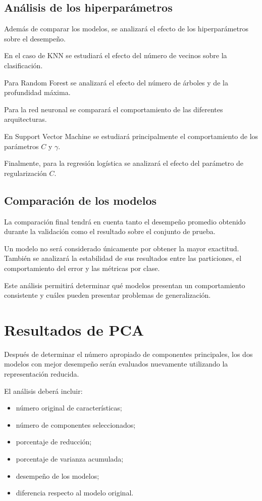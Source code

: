 \documentclass[conference]{IEEEtran}
\begin{document}
\subsection{Análisis de los hiperparámetros}

Además de comparar los modelos, se analizará el efecto de los hiperparámetros sobre el desempeño.

En el caso de KNN se estudiará el efecto del número de vecinos sobre la clasificación.

Para Random Forest se analizará el efecto del número de árboles y de la profundidad máxima.

Para la red neuronal se comparará el comportamiento de las diferentes arquitecturas.

En Support Vector Machine se estudiará principalmente el comportamiento de los parámetros $C$ y $\gamma$.

Finalmente, para la regresión logística se analizará el efecto del parámetro de regularización $C$.


\subsection{Comparación de los modelos}

La comparación final tendrá en cuenta tanto el desempeño promedio obtenido durante la validación como el resultado sobre el conjunto de prueba.

Un modelo no será considerado únicamente por obtener la mayor exactitud. También se analizará la estabilidad de sus resultados entre las particiones, el comportamiento del error y las métricas por clase.

Este análisis permitirá determinar qué modelos presentan un comportamiento consistente y cuáles pueden presentar problemas de generalización.


\section{Resultados de PCA}

Después de determinar el número apropiado de componentes principales, los dos modelos con mejor desempeño serán evaluados nuevamente utilizando la representación reducida.

El análisis deberá incluir:

\begin{itemize}
    \item número original de características;
    \item número de componentes seleccionados;
    \item porcentaje de reducción;
    \item porcentaje de varianza acumulada;
    \item desempeño de los modelos;
    \item diferencia respecto al modelo original.
\end{itemize}
\end{document}
